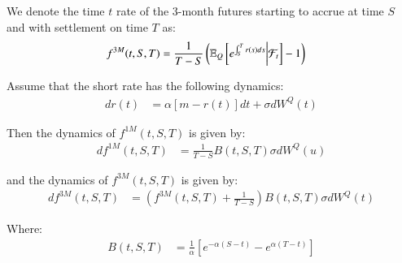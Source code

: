 \begin{definition}
\label{def: 3M_SOFR_futures}
We denote the time $t$ rate of the 3-month futures starting to accrue at time $S$ and with settlement on time $T$ as:  
\begin{align*}
f^{3M}(t,S,T) &= \frac{1}{T-S}\left(
\mathbb{E}_{Q}\left[e^{\int_{S}^{T}r(s)ds}\bigg{|}\mathcal{F}_{t}\right] - 1
\right)    
\end{align*}
\end{definition} 

\newpage 

\begin{proposition}
Assume that the short rate has the following dynamics: 
\begin{align*}
dr(t) &= \alpha[m-r(t)]dt + \sigma dW^{Q}(t)    
\end{align*}

Then the dynamics of $f^{1M}(t,S,T)$ is given by:
\begin{align*}
df^{1M}(t,S,T) &= \frac{1}{T-S}B(t,S,T)\sigma dW^{Q}(u)
\end{align*}

and the dynamics of $f^{3M}(t,S,T)$ is given by: 
\begin{align*}
df^{3M}(t,S,T) &= \left(
f^{3M}(t,S,T) +\frac{1}{T-S}
\right)B(t,S,T)\sigma dW^{Q}(t)
\end{align*}

Where: 
\begin{align*}
B(t,S,T) &= \frac{1}{\alpha}\left[
e^{-\alpha(S-t)}-e^{\alpha(T-t)}
\right]    
\end{align*}
\end{proposition}


